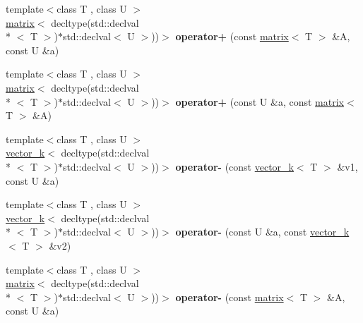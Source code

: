 \begin{DoxyCompactItemize}
\item 
\hypertarget{namespacekeycpp_adff86e062c6497110b7505b0ef715c2c}{{\footnotesize template$<$class T , class U $>$ }\\\hyperlink{classkeycpp_1_1matrix}{matrix}$<$ decltype(std\-::declval\\*
$<$ T $>$)$\ast$std\-::declval$<$ U $>$))$>$ {\bfseries operator+} (const \hyperlink{classkeycpp_1_1matrix}{matrix}$<$ T $>$ \&A, const U \&a)}\label{namespacekeycpp_adff86e062c6497110b7505b0ef715c2c}

\item 
\hypertarget{namespacekeycpp_a4b4a64905c9d681c174b2dfcfba272c4}{{\footnotesize template$<$class T , class U $>$ }\\\hyperlink{classkeycpp_1_1matrix}{matrix}$<$ decltype(std\-::declval\\*
$<$ T $>$)$\ast$std\-::declval$<$ U $>$))$>$ {\bfseries operator+} (const U \&a, const \hyperlink{classkeycpp_1_1matrix}{matrix}$<$ T $>$ \&A)}\label{namespacekeycpp_a4b4a64905c9d681c174b2dfcfba272c4}

\item 
\hypertarget{namespacekeycpp_a520b72efca1fbe800845b21a84d2d472}{{\footnotesize template$<$class T , class U $>$ }\\\hyperlink{classkeycpp_1_1vector__k}{vector\-\_\-k}$<$ decltype(std\-::declval\\*
$<$ T $>$)$\ast$std\-::declval$<$ U $>$))$>$ {\bfseries operator-\/} (const \hyperlink{classkeycpp_1_1vector__k}{vector\-\_\-k}$<$ T $>$ \&v1, const U \&a)}\label{namespacekeycpp_a520b72efca1fbe800845b21a84d2d472}

\item 
\hypertarget{namespacekeycpp_a1222c1fe6037feb8eacf0d2bd5152751}{{\footnotesize template$<$class T , class U $>$ }\\\hyperlink{classkeycpp_1_1vector__k}{vector\-\_\-k}$<$ decltype(std\-::declval\\*
$<$ T $>$)$\ast$std\-::declval$<$ U $>$))$>$ {\bfseries operator-\/} (const U \&a, const \hyperlink{classkeycpp_1_1vector__k}{vector\-\_\-k}$<$ T $>$ \&v2)}\label{namespacekeycpp_a1222c1fe6037feb8eacf0d2bd5152751}

\item 
\hypertarget{namespacekeycpp_a71a8f2ebc458f06e29b17ecc28ed000d}{{\footnotesize template$<$class T , class U $>$ }\\\hyperlink{classkeycpp_1_1matrix}{matrix}$<$ decltype(std\-::declval\\*
$<$ T $>$)$\ast$std\-::declval$<$ U $>$))$>$ {\bfseries operator-\/} (const \hyperlink{classkeycpp_1_1matrix}{matrix}$<$ T $>$ \&A, const U \&a)}\label{namespacekeycpp_a71a8f2ebc458f06e29b17ecc28ed000d}


\end{DoxyCompactItemize}
